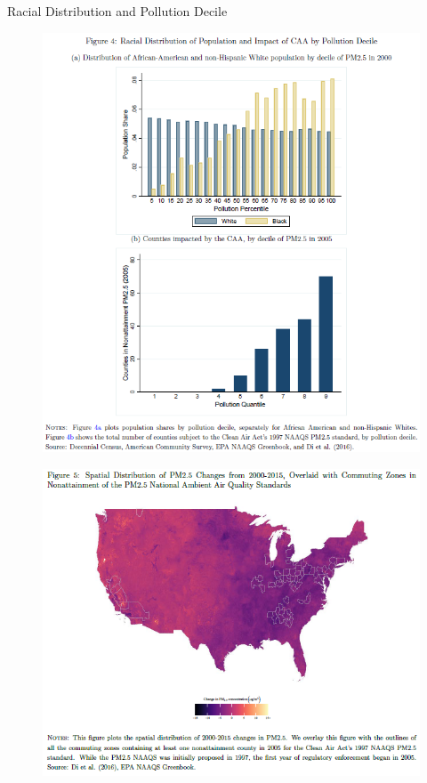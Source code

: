 \documentclass[dvipdfmx,12pt]{beamer}
\begin{document}
\begin{frame}{Racial Distribution and Pollution Decile}
  \begin{figure}
    \centering
    \includegraphics[scale = .4]{F4.png}
  \end{figure}
\end{frame}

\begin{frame}{}
  \begin{figure}
    \centering
    \includegraphics[scale = .6]{F5.png}
  \end{figure}
\end{frame}
\end{document}
